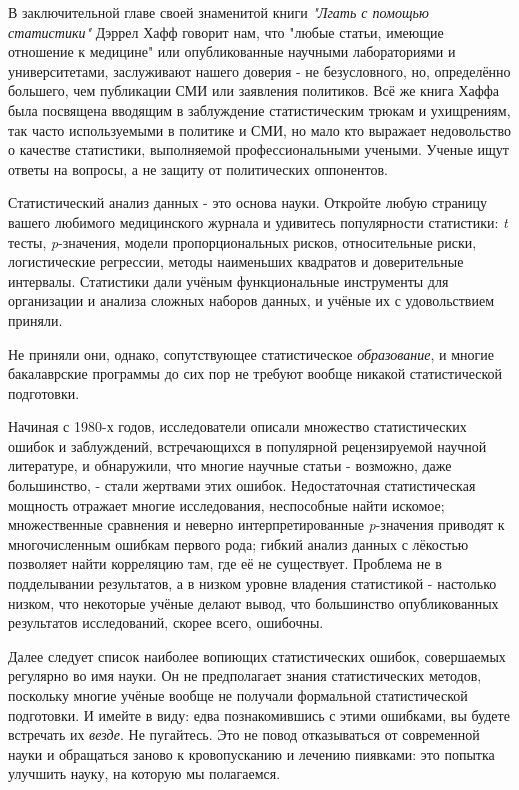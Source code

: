 В заключительной главе своей знаменитой книги \emph{"Лгать с помощью статистики"} Дэррел Хафф говорит нам, что "любые статьи, имеющие отношение к медицине" или опубликованные научными лабораториями и университетами, заслуживают нашего доверия - не безусловного, но, определённо большего, чем публикации СМИ или заявления политиков. Всё же книга Хаффа была посвящена вводящим в заблуждение статистическим трюкам и ухищрениям, так часто используемыми в политике и СМИ, но мало кто выражает недовольство о качестве статистики, выполняемой профессиональными учеными. Ученые ищут ответы на вопросы, а не защиту от политических оппонентов.


Статистический анализ данных - это основа науки. Откройте любую страницу вашего любимого медицинского журнала и удивитесь популярности статистики: \emph{t} тесты, \emph{p}-значения, модели пропорциональных рисков, относительные риски, логистические регрессии, методы наименьших квадратов и доверительные интервалы. Статистики дали учёным функциональные инструменты для организации и анализа сложных наборов данных, и учёные их с удовольствием приняли.
 
Не приняли они, однако, сопутствующее статистическое \emph{образование}, и многие бакалаврские программы до сих пор не требуют вообще никакой статистической подготовки.

Начиная с 1980-х годов, исследователи описали множество статистических ошибок и заблуждений, встречающихся в популярной рецензируемой научной литературе, и обнаружили, что многие научные статьи - возможно, даже большинство, - стали жертвами этих ошибок. Недостаточная статистическая мощность отражает многие исследования, неспособные найти искомое; множественные сравнения и неверно интерпретированные \emph{p}-значения приводят к многочисленным ошибкам первого рода; гибкий анализ данных с лёкостью позволяет найти корреляцию там, где её не существует. Проблема не в подделывании результатов, а в низком уровне владения статистикой - настолько низком, что некоторые учёные делают вывод, что большинство опубликованных результатов исследований, скорее всего, ошибочны.\cite{ioannidis_why_2005}

Далее следует список наиболее вопиющих статистических ошибок, совершаемых регулярно во имя науки. Он не предполагает знания статистических методов, поскольку многие учёные вообще не получали формальной статистической подготовки. И имейте в виду: едва познакомившись с этими ошибками, вы будете встречать их \emph{везде}. Не пугайтесь. Это не повод отказываться от современной науки и обращаться заново к кровопусканию и лечению пиявками: это попытка улучшить науку, на которую мы полагаемся.
 

